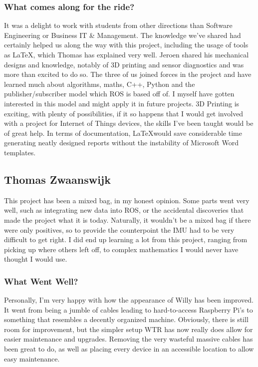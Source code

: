\subsubsection{What comes along for the ride?}
It was a delight to work with students from other directions than Software Engineering or Business IT \& Management. 
The knowledge we've shared had certainly helped us along the way with this project, including the usage of tools as \LaTeX, which Thomas has explained very well. Jeroen shared his mechanical designs and knowledge, notably of 3D printing and sensor diagnostics and was more than excited to do so.
The three of us joined forces in the project and have learned much about algorithms, maths, C++, Python and the publisher/subscriber model which ROS is based off of.
I myself have gotten interested in this model and might apply it in future projects.
3D Printing is exciting, with plenty of possibilities, if it so happens that I would get involved with a project for Internet of Things devices, the skills I've been taught would be of great help.
In terms of documentation, \LaTeX would save considerable time generating neatly designed reports without the instability of Microsoft Word templates.


\newpage

\subsection{Thomas Zwaanswijk}
This project has been a mixed bag, in my honest opinion.
Some parts went very well, such as integrating new data into ROS, or the accidental discoveries that made the project what it is today.
Naturally, it wouldn't be a mixed bag if there were only positives, so to provide the counterpoint the IMU had to be very difficult to get right.
I did end up learning a lot from this project, ranging from picking up where others left off, to complex mathematics I would never have thought I would use.

\subsubsection{What Went Well?}
Personally, I'm very happy with how the appearance of Willy has been improved.
It went from being a jumble of cables leading to hard-to-access Raspberry Pi's to something that resembles a decently organized machine.
Obviously, there is still room for improvement, but the simpler setup WTR has now really does allow for easier maintenance and upgrades.
Removing the very wasteful massive cables has been great to do, as well as placing every device in an accessible location to allow easy maintenance.

